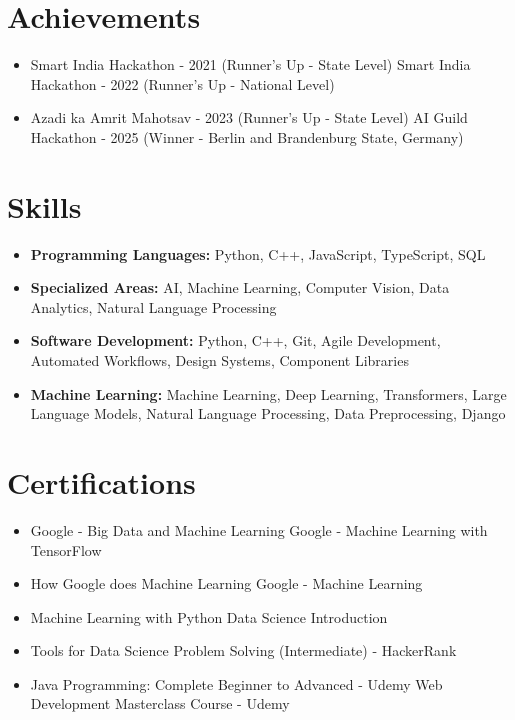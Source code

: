 \documentclass[a4paper,10pt]{article}
\begin{document}
\section*{Achievements}
\begin{itemize}
\item Smart India Hackathon - 2021 (Runner's Up - State Level) \hfill Smart India Hackathon - 2022 (Runner's Up - National Level)
\item Azadi ka Amrit Mahotsav - 2023 (Runner's Up - State Level) \hfill AI Guild Hackathon - 2025 (Winner - Berlin and Brandenburg State, Germany)
\end{itemize}

\section*{Skills}
\begin{itemize}
  \item \textbf{Programming Languages:} Python, C++, JavaScript, TypeScript, SQL
  \item \textbf{Specialized Areas:} AI, Machine Learning, Computer Vision, Data Analytics, Natural Language Processing
  \item \textbf{Software Development:} Python, C++, Git, Agile Development, Automated Workflows, Design Systems, Component Libraries
  \item \textbf{Machine Learning:} Machine Learning, Deep Learning, Transformers, Large Language Models, Natural Language Processing, Data Preprocessing, Django
\end{itemize}

\section*{Certifications}
\begin{itemize}
\item Google - Big Data and Machine Learning \hfill Google - Machine Learning with TensorFlow
\item How Google does Machine Learning \hfill Google - Machine Learning
\item Machine Learning with Python \hfill Data Science Introduction
\item Tools for Data Science \hfill Problem Solving (Intermediate) - HackerRank
\item Java Programming: Complete Beginner to Advanced - Udemy \hfill Web Development Masterclass Course - Udemy
\end{itemize}
\end{document}
